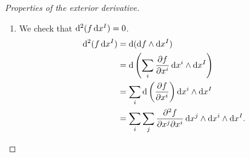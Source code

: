 \begin{proof}[Properties of the exterior derivative]
  \begin{enumerate}
    \item{
      We check that
      $\mathop{}\!\mathrm{d}^2 (f \mathop{}\!\mathrm{d} x^I) = 0$.
      \begin{align*}
         \dif^2 (f \dif x^I)
      &= \dif (\dif f \wedge \dif x^I) \\
      &= \dif \left(
           \sum_i
             \frac{\partial f}{\partial x^i}
             \dif x^i \wedge \dif x^I
         \right) \\
      &= \sum_i
           \dif \left(
             \frac{\partial f}
                  {\partial x^i}
           \right)
           \dif x^i \wedge \dif x^I \\
      &= \sum_i
           \sum_j
             \frac{\partial^2 f}
                  {\partial x^j \partial x^i}
             \dif x^j \wedge \dif x^i \wedge \dif x^I.
      \end{align*}

}
\end{enumerate}
\end{proof}

